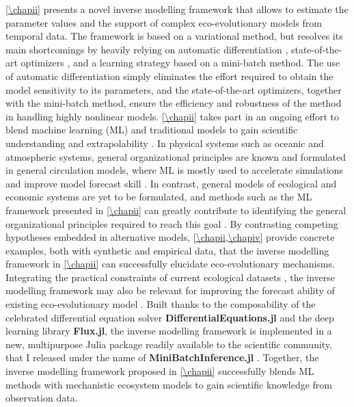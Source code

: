 %
\cref{\chapii} presents a novel inverse modelling framework that allows to estimate the parameter values and the support of complex eco-evolutionary models from temporal data.
% 
The framework is based on a variational method, but resolves its main shortcomings by heavily relying on automatic differentiation \citep{Rackauckas2020a}, state-of-the-art optimizers \citep{Kingma2014}, and a learning strategy based on a mini-batch method. 
% 
The use of automatic differentiation simply eliminates the effort required to obtain the model sensitivity to its parameters, and the state-of-the-art optimizers, together with the mini-batch method, ensure the efficiency and robustness of the method in handling highly nonlinear models.
% 
\cref{\chapii} takes part in an ongoing effort to blend machine learning (ML) and traditional models to gain scientific understanding and extrapolability \citep{Karpatne2017,Rackauckas2020a,Schneider2017,Rolnick2023,Kashinath2021,Yazdani2020,Raissi2019}. 
% 
In physical systems such as oceanic and atmospheric systems, general organizational principles are known and formulated in general circulation models, where ML is mostly used to accelerate simulations \citep{Kashinath2021} and improve model forecast skill \citep{Schneider2017}. In contrast, general models of ecological and economic systems are yet to be formulated, and methods such as the ML framework presented in \cref{\chapii} can greatly contribute to identifying the general organizational principles required to reach this goal \citep{Karpatne2017}. 
% 
By contrasting competing hypotheses embedded in alternative models, \cref{\chapii,\chapiv} provide concrete examples, both with synthetic and empirical data, that the inverse modelling framework in \cref{\chapii} can successfully elucidate eco-evolutionary mechanisms.
Integrating the practical constraints of current ecological datasets \citep{Dornelas2018}, the inverse modelling framework may also be relevant for improving the forecast ability of existing eco-evolutionary model \citep{Norberg2012}.
% 
Built thanks to the composability of the celebrated differential equation solver \textbf{DifferentialEquations.jl} and the deep learning library \textbf{Flux.jl}, the inverse modelling framework is implemented in a new, multipurpose Julia package readily available to the scientific community, that I released under the name of \textbf{MiniBatchInference.jl} \citep{MiniBatchInference}.
% 
Together, the inverse modelling framework proposed in \cref{\chapii} successfully blends ML methods with mechanistic ecosystem models to gain scientific knowledge from observation data. 

